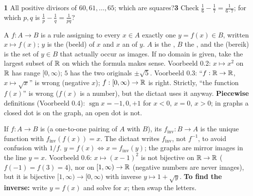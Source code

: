\begin{trybox}[{1, 3}]
\textbf{1} All positive divisors of $60,61,\dots,65$; which are squares?\quad \textbf{3} Check $\frac16-\frac17=\frac1{6\cdot7}$; for which $p,q$ is $\frac1p-\frac1q=\frac1{pq}$?
\end{trybox}


\begin{key}
A  $f:A\to B$ is a rule assigning to every $x\in A$ exactly one $y=f(x)\in B$, written $x\mapsto f(x)$; $y$ is the  (beeld) of $x$ and $x$ an  of $y$. $A$ is the , $B$ the , and the  (bereik) is the set of $y\in B$ that actually occur as images. If no domain is given, take the largest subset of $\mathbb{R}$ on which the formula makes sense. Voorbeeld 0.2: $x\mapsto x^2$ on $\mathbb{R}$ has range $[0,\infty)$; $5$ has the two originals $\pm\sqrt5$. Voorbeeld 0.3: ``$f:\mathbb{R}\to\mathbb{R}$, $x\mapsto\sqrt x$'' is wrong (negative $x$); $f:[0,\infty)\to\mathbb{R}$ is right. Strictly, ``the function $f(x)$'' is wrong ($f(x)$ is a number), but the dictaat uses it anyway. \textbf{Piecewise} definitions (Voorbeeld 0.4): $\operatorname{sgn}x=-1,0,+1$ for $x<0$, $x=0$, $x>0$; in graphs a closed dot is on the graph, an open dot is not.
\end{key}
\begin{key}
If $f:A\to B$ is  (a one-to-one pairing of $A$ with $B$), its  $f_{\mathrm{inv}}:B\to A$ is the unique function with $f_{\mathrm{inv}}(f(x))=x$. The dictaat writes $f_{\mathrm{inv}}$, not $f^{-1}$, to avoid confusion with $1/f$. $y=f(x)\Leftrightarrow x=f_{\mathrm{inv}}(y)$; the graphs are mirror images in the line $y=x$. Voorbeeld 0.6: $x\mapsto(x-1)^2$ is not bijective on $\mathbb{R}\to\mathbb{R}$ ($f(-1)=f(3)=4$), nor on $[1,\infty)\to\mathbb{R}$ (negative numbers are never images), but it is bijective $[1,\infty)\to[0,\infty)$ with inverse $y\mapsto1+\sqrt y$. \textbf{To find the inverse:} write $y=f(x)$ and solve for $x$; then swap the letters.
\end{key}

